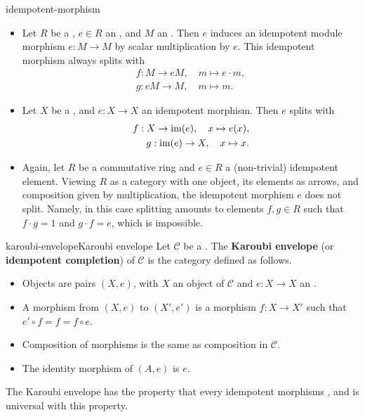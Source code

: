 \begin{example}{idempotent-morphism}
    \begin{itemize}
        \item Let $R$ be a , $e \in R$ an , and $M$ an . Then $e$ induces an idempotent module morphism $e : M \to M$ by scalar multiplication by $e$. This idempotent morphism always splits with
        \[ \begin{aligned}
            f : M \to eM, \quad m \mapsto e \cdot m , \\
            g : eM \to M, \quad m \mapsto m .
        \end{aligned} \]
        \item Let $X$ be a , and $e : X \to X$ an idempotent morphism. Then $e$ splits with
        \[ \begin{aligned}
            f : X \to \operatorname{im}(e), \quad x \mapsto e(x) , \\
            g : \operatorname{im}(e) \to X, \quad x \mapsto x .
        \end{aligned} \]
        \item Again, let $R$ be a commutative ring and $e \in R$ a (non-trivial) idempotent element. Viewing $R$ as a category with one object, its elements as arrows, and composition given by multiplication, the idempotent morphism $e$ does not split. Namely, in this case splitting amounts to elements $f, g \in R$ such that $f \cdot g = 1$ and $g \cdot f = e$, which is impossible.
    \end{itemize}
\end{example}

\begin{topic}{karoubi-envelope}{Karoubi envelope}
    Let $\mathcal{C}$ be a . The \textbf{Karoubi envelope} (or \textbf{idempotent completion}) of $\mathcal{C}$ is the category defined as follows.
    \begin{itemize}
        \item Objects are pairs $(X, e)$, with $X$ an object of $\mathcal{C}$ and $e : X \to X$ an .
        \item A morphism from $(X, e)$ to $(X', e')$ is a morphism $f : X \to X'$ such that $e' \circ f = f = f \circ e$.
        \item Composition of morphisms is the same as composition in $\mathcal{C}$.
        \item The identity morphism of $(A, e)$ is $e$.
    \end{itemize}
    The Karoubi envelope has the property that every idempotent morphisms , and is universal with this property.
\end{topic}

